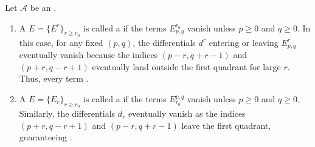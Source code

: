 \begin{definition} \label{definition:first_quadrant_spectral_sequence}
    Let $\mathcal{A}$ be an .
    \begin{enumerate}
        \item A  $E = \{E^r\}_{r \ge r_0}$ is called a  if the terms $E^{r_0}_{p,q}$ vanish unless $p \ge 0$ and $q \ge 0$.
        In this case, for any fixed $(p,q)$, the differentials $d^r$ entering or leaving $E^r_{p,q}$ eventually vanish because the indices $(p-r, q+r-1)$ and $(p+r, q-r+1)$ eventually land outside the first quadrant for large $r$. Thus, every term .
        
        \item A  $E = \{E_r\}_{r \ge r_0}$ is called a  if the terms $E_{r_0}^{p,q}$ vanish unless $p \ge 0$ and $q \ge 0$.
        Similarly, the differentials $d_r$ eventually vanish as the indices $(p+r, q-r+1)$ and $(p-r, q+r-1)$ leave the first quadrant, guaranteeing .
    \end{enumerate}
\end{definition}